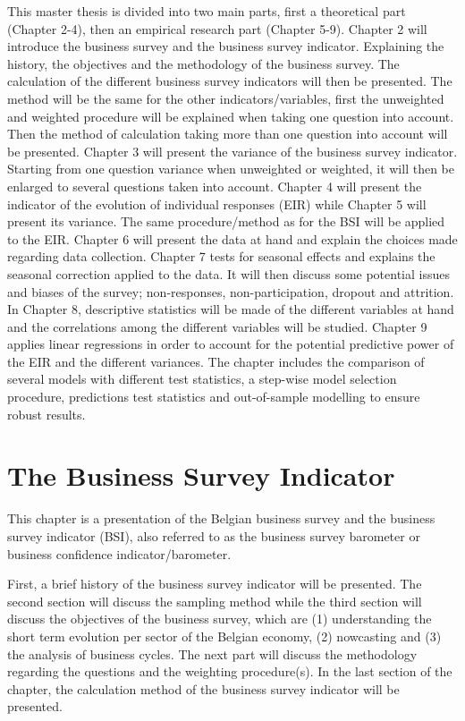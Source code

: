 \documentclass[12pt,a4paper,oneside]{book}
\begin{document}
This master thesis is divided into two main parts, first a theoretical part (Chapter 2-4), then an empirical research part (Chapter 5-9).
Chapter 2 will introduce the business survey and the business survey indicator. Explaining the history, the objectives and the methodology of the business survey. The calculation of the different business survey indicators will then be presented. The method will be the same for the other indicators/variables, first the unweighted and weighted procedure will be explained when taking one question into account. Then the method of calculation taking more than one question into account will be presented.
Chapter 3 will present the variance of the business survey indicator. Starting from one question variance when unweighted or weighted, it will then be enlarged to several questions taken into account.
Chapter 4 will present the indicator of the evolution of individual responses (EIR) while Chapter 5 will present its variance. The same procedure/method as for the BSI will be applied to the EIR.
Chapter 6 will present the data at hand and explain the choices made regarding data collection.
Chapter 7 tests for seasonal effects and explains the seasonal correction applied to the data. It will then discuss some potential issues and biases of the survey; non-responses, non-participation, dropout and attrition.
In Chapter 8, descriptive statistics will be made of the different variables at hand and the correlations among the different variables will be studied.
Chapter 9 applies linear regressions in order to account for the potential predictive power of the EIR and the different variances. 
The chapter includes the comparison of several models with different test statistics, a step-wise model selection procedure, predictions test statistics and out-of-sample modelling to ensure robust results.


\chapter{The Business Survey Indicator}

This chapter is a presentation of the Belgian business survey and the business survey indicator (BSI), also referred to as the business survey barometer or business confidence indicator/barometer.

First, a brief history of the business survey indicator will be presented.
The second section will discuss the sampling method while the third section will discuss the objectives of the business survey, which are (1) understanding the short term evolution per sector of the Belgian economy, (2) nowcasting and (3) the analysis of business cycles.
The next part will discuss the methodology regarding the questions and the weighting procedure(s).
In the last section of the chapter, the calculation method of the business survey indicator will be presented.
\end{document}
